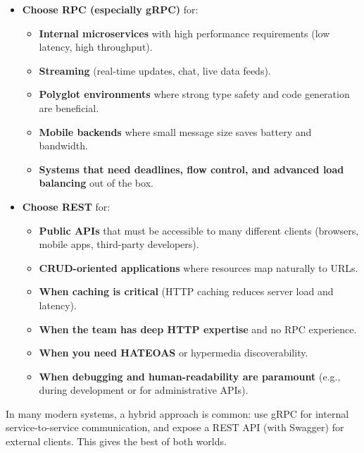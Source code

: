 \documentclass[10pt,a4paper]{article}
\begin{document}
\begin{itemize}
    \item \textbf{Choose RPC (especially gRPC)} for:
        \begin{itemize}
            \item \textbf{Internal microservices} with high performance requirements (low latency, high throughput).
            \item \textbf{Streaming} (real-time updates, chat, live data feeds).
            \item \textbf{Polyglot environments} where strong type safety and code generation are beneficial.
            \item \textbf{Mobile backends} where small message size saves battery and bandwidth.
            \item \textbf{Systems that need deadlines, flow control, and advanced load balancing} out of the box.
        \end{itemize}
    \item \textbf{Choose REST} for:
        \begin{itemize}
            \item \textbf{Public APIs} that must be accessible to many different clients (browsers, mobile apps, third-party developers).
            \item \textbf{CRUD-oriented applications} where resources map naturally to URLs.
            \item \textbf{When caching is critical} (HTTP caching reduces server load and latency).
            \item \textbf{When the team has deep HTTP expertise} and no RPC experience.
            \item \textbf{When you need HATEOAS} or hypermedia discoverability.
            \item \textbf{When debugging and human-readability are paramount} (e.g., during development or for administrative APIs).
        \end{itemize}
\end{itemize}

In many modern systems, a hybrid approach is common: use gRPC for internal service-to-service communication, and expose a REST API (with Swagger) for external clients. This gives the best of both worlds.
\end{document}
